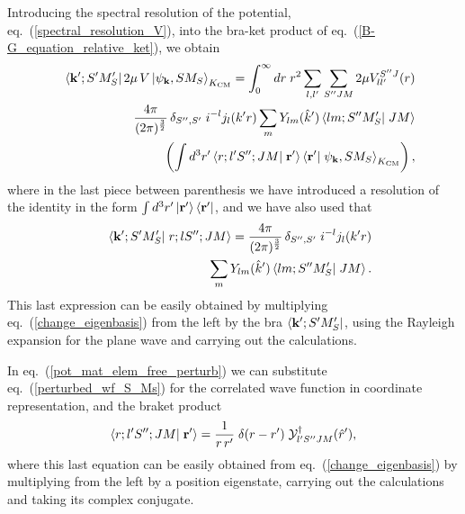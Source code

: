 \documentclass[aps,twocolumn,showpacs,preprintnumbers,amsmath,amssymb,nofootinbib,superscriptaddress,showkeys,noeprint]{revtex4-1}
\newcommand{\nk}{{\bf k}}
\newcommand{\nr}{{\bf r}}
\begin{document}
Introducing the spectral resolution of the potential,
eq.~(\ref{spectral_resolution_V}), into the bra-ket product of
eq.~(\ref{B-G_equation_relative_ket}), we obtain
\begin{eqnarray}
 &&\left\langle \nk^\prime; S^\prime M^\prime_S \right| 2\mu\, V  
\left| \psi_{\nk}, S M_S \right\rangle_{K_{\rm CM}}=
\int^\infty_0 dr\;r^2 
\sum_{l,l^\prime}
\sum_{S^{\prime\prime}JM}
2\mu V^{S^{\prime\prime}J}_{ll^\prime}(r)\nonumber\\
&&\frac{4\pi}{(2\pi)^\frac32}\,
\delta_{S^{\prime\prime},S^\prime}
\;i^{-l}j_l(k^\prime r)\sum_m
Y_{lm}(\hat{k}^\prime)
\left\langle lm;S^{\prime\prime}
M^\prime_S\right|\left.JM
\right\rangle\nonumber\\
&&\left(\int d^3r^\prime
\left\langle r;l^\prime 
S^{\prime\prime};JM\right|\left.
\nr^\prime\right\rangle
\left\langle \nr^\prime\right|
\left. \psi_{\nk},S M_S
\right\rangle_{K_{\rm CM}}\right),
\label{pot_mat_elem_free_perturb}
\end{eqnarray}
where in the last piece between parenthesis we have introduced a
resolution of the identity in the form $\int d^3r^\prime
\left|\nr^\prime\right\rangle \left\langle \nr^\prime\right|$, and we
have also used that
\begin{eqnarray}
 &&\left\langle \nk^\prime;
 S^\prime M^\prime_S\right|
 \left. r;lS^{\prime\prime};JM
 \right\rangle=\frac{4\pi}{(2\pi)^\frac32}\,
\delta_{S^{\prime\prime},S^\prime}
\;i^{-l}j_l(k^\prime r)\nonumber\\
&&\sum_m Y_{lm}(\hat{k}^\prime)
\left\langle lm;S^{\prime\prime}
M^\prime_S\right|\left.JM
\right\rangle.\label{braket_eigen_momspin_rad_coupled}
\end{eqnarray}
This last expression can be easily obtained by multiplying
eq.~(\ref{change_eigenbasis}) from the left by the bra $\left\langle
\nk^\prime; S^\prime M^\prime_S\right|$, using the Rayleigh expansion
for the plane wave and carrying out the calculations.

In eq.~(\ref{pot_mat_elem_free_perturb}) we can substitute
eq.~(\ref{perturbed_wf_S_Ms}) for the correlated wave function in
coordinate representation, and the braket product
\begin{equation}\label{braket_prod_r_coupled_lsjm_pos_eigenket}
 \left\langle r;l^\prime S^{\prime\prime};JM\right|
 \left. \nr^\prime \right\rangle=
 \frac{1}{r\,r^\prime}\;
 \delta(r-r^\prime)\;
 \mathcal{Y}^\dagger_{l^\prime 
 S^{\prime\prime}JM}(\hat{r}^\prime),
\end{equation}
where this last equation can be easily obtained from
eq.~(\ref{change_eigenbasis}) by multiplying from the left by a
position eigenstate, carrying out the calculations and taking its
complex conjugate.
\end{document}

